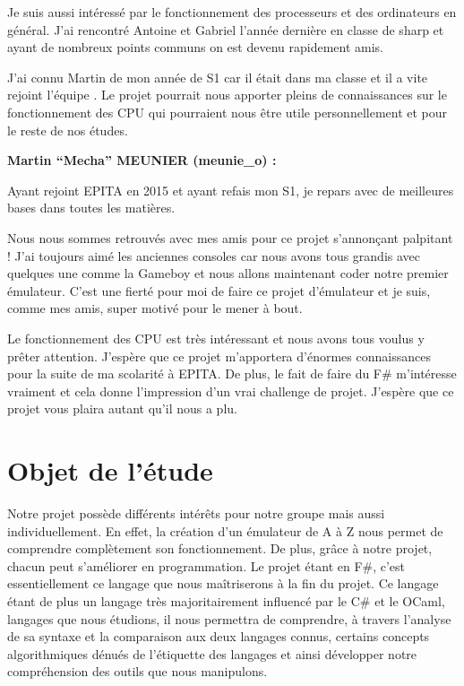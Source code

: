 \documentclass[12pt, a4paper]{article}
\begin{document}
Je suis aussi intéressé par le fonctionnement des processeurs et des ordinateurs en général. J’ai rencontré Antoine et Gabriel l’année dernière en classe de sharp et ayant de nombreux points communs on est devenu rapidement amis. 
\medskip

J’ai connu Martin de mon année de S1 car il était dans ma classe et il a vite rejoint l’équipe . Le projet pourrait nous apporter pleins de connaissances sur le fonctionnement des CPU qui pourraient nous être utile personnellement et pour le reste de nos études.
\bigskip
\bigskip
\bigskip

\textbf{Martin “Mecha” MEUNIER (meunie\_o) :} 
\medskip 

Ayant rejoint EPITA en 2015 et ayant refais mon S1, je repars avec de meilleures bases dans toutes les matières.
\medskip

Nous nous sommes retrouvés avec mes amis pour ce projet s’annonçant palpitant ! J’ai toujours aimé les anciennes consoles car nous avons tous grandis avec quelques une comme la Gameboy et nous allons maintenant coder notre premier émulateur. C’est une fierté pour moi de faire ce projet d’émulateur et je suis, comme mes amis, super motivé pour le mener à bout.
\medskip

Le fonctionnement des CPU est très intéressant et nous avons tous voulus y prêter attention. J’espère que ce projet m’apportera d’énormes connaissances pour la suite de ma scolarité à EPITA. De plus, le fait de faire du F\# m'intéresse vraiment et cela donne l’impression d’un vrai challenge de projet. J’espère que ce projet vous plaira autant qu’il nous a plu.
\bigskip
\bigskip


\pagebreak

\section{Objet de l'étude}

Notre projet possède différents intérêts pour notre groupe mais aussi individuellement. En effet, la création d'un émulateur de A à Z nous permet de comprendre complètement son fonctionnement. De plus, grâce à notre projet, chacun peut s'améliorer en programmation. Le projet étant en F\#, c'est essentiellement ce langage que nous maîtriserons à la fin du projet. Ce langage étant de plus un langage très majoritairement influencé par le C\# et le OCaml, langages que nous étudions, il nous permettra de comprendre, à travers l'analyse de sa syntaxe et la comparaison aux deux langages connus, certains concepts algorithmiques  dénués de l'étiquette des langages et ainsi développer notre compréhension des outils que nous manipulons. 
\medskip
\end{document}
